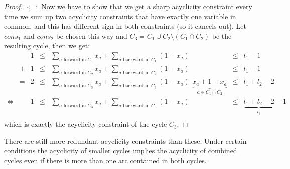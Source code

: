 \begin{proof}
$\Leftarrow :$ Now we have to show that we get a sharp acyclicity constraint every time we sum up two acyclicity 
constraints that have exactly one variable in common, and this has different sign in both constraints (so it cancels 
out). Let $cons_1$ and $cons_2$ be chosen this way and $C_3=C_1\cup C_2\setminus (C_1\cap C_2)$ be the resulting cycle, 
then we get:
\begin{align*}
 &&1&\le &\sum_{a \textrm{ forward in }C_1}x_a + \sum_{a\textrm{ backward in }C_1}{(1-x_a)}&&\le &l_1-1\\
 &+&1&\le &\sum_{a \textrm{ forward in }C_2}x_a + \sum_{a\textrm{ backward in }C_2}{(1-x_a)}&&\le &l_1-1\\
 &=&2&\le &\sum_{a \textrm{ forward in }C_3}x_a +\sum_{a\textrm{ backward in }C_3}{(1-x_a)}+
 &\underbrace{x_a+1-x_a}_{a\in C_1\cap C_2} &\le &l_1+l_2-2\\
 \iff &&1&\le &\sum_{a \textrm{ forward in }C_3}x_a +\sum_{a\textrm{ backward in }C_3}{(1-x_a)}
 &&\le &\underbrace{l_1+l_2-2}_{l_3}-1\\
\end{align*}
which is exactly the acyclicity constraint of the cycle $C_3$.
\end{proof}
There are still more redundant acyclicity constraints than these. Under certain conditions the acyclicity of smaller 
cycles implies the acyclicity of combined cycles even if there is more than one arc contained in both cycles.

